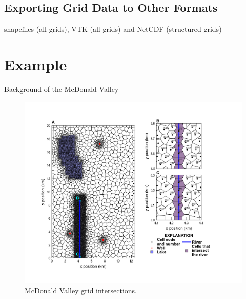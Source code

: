 \documentclass[11pt, oneside]{article}   	%
\begin{document}
\subsection{Exporting Grid Data to Other Formats}

shapefiles (all grids), VTK (all grids) and NetCDF (structured grids)

\section{Example}

Background of the McDonald Valley

\begin{figure}[ht!]
	\begin{center}
		\includegraphics{figures/mv_voronoi_river_discretization.png}
	\end{center}
	\caption{McDonald Valley grid intersections.}
	\label{fig:mvgrid}
\end{figure}
\end{document}
